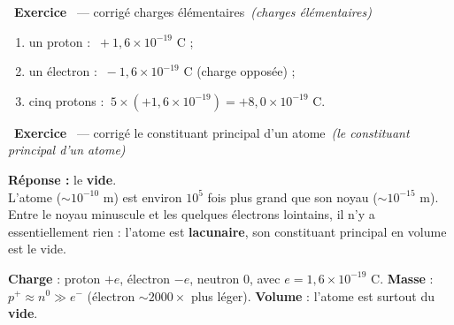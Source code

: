 \documentclass[11pt,a4paper]{article}
\newcommand{\pp}{p^{+}}
\newcommand{\ee}{e^{-}}
\newcommand{\nz}{n^{0}}
\newcommand{\rep}{\textbf{\color{excol}Réponse : }}
\newcounter{exo}
\newcommand{\cor}[1][]{\stepcounter{exo}\par\medskip%
  \noindent{\color{primary}\rule[-2pt]{3.5pt}{15pt}}\ \textbf{\color{primarydark}\large Exercice \theexo}%
  \ \textmd{\normalsize\color{black!55}— corrigé}%
  \ifx\relax#1\relax\relax\else\ \textmd{\normalsize\color{black!65}\itshape (#1)}\fi\par\nopagebreak\smallskip}
\begin{document}
\cor[charges élémentaires]
\begin{enumerate}[label=\alph*)]
  \item un proton : $\ +1{,}6\times10^{-19}$ C ;
  \item un électron : $\ -1{,}6\times10^{-19}$ C (charge opposée) ;
  \item cinq protons : $\ 5\times(+1{,}6\times10^{-19}) = +8{,}0\times10^{-19}$ C.
\end{enumerate}

\cor[le constituant principal d'un atome]
\rep le \textbf{vide}. \\
L'atome ($\sim10^{-10}$ m) est environ $10^{5}$ fois plus grand que son noyau ($\sim10^{-15}$ m). Entre
le noyau minuscule et les quelques électrons lointains, il n'y a essentiellement rien : l'atome est
\textbf{lacunaire}, son constituant principal en volume est le vide.

\begin{bilan}
\textbf{Charge} : proton $+e$, électron $-e$, neutron $0$, avec $e=1{,}6\times10^{-19}$ C. \quad
\textbf{Masse} : $\pp\approx\nz\gg\ee$ (électron $\sim2000\times$ plus léger). \quad
\textbf{Volume} : l'atome est surtout du \textbf{vide}.
\end{bilan}
\end{document}
